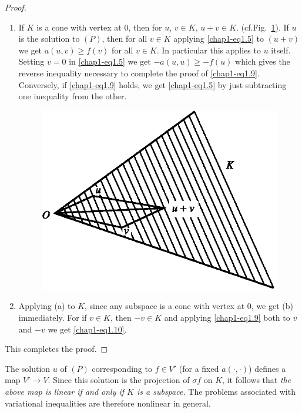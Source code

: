 \begin{proof}
\begin{enumerate}
\renewcommand{\theenumi}{\alph{enumi}}
\renewcommand{\labelenumi}{(\theenumi)}
\item If $K$ is a cone with vertex at $0$, then for $u$, $v\in K$, $u+v\in
K$. (cf.\@ Fig.~\ref{chap1-fig1.2}). If $u$ is the solution to $(P)$, then for all
$v\in K$ applying \eqref{chap1-eq1.5} to $(u+v)$ we get $a(u,v)\geq
f(v)$ for all $v\in K$. In particular this applies to $u$
itself. Setting $v=0$ in \eqref{chap1-eq1.5} we get $-a(u,u)\geq
-f(u)$ which gives the reverse inequality necessary to complete the
proof of \eqref{chap1-eq1.9}. Conversely, if \eqref{chap1-eq1.9}
holds, we get \eqref{chap1-eq1.5} by just subtracting one inequality
from the other.
\begin{figure}[H]
\centering
\includegraphics{figure/fig1.2.eps}
\caption{}\label{chap1-fig1.2}
\end{figure}

\item Applying (a) to $K$, since any subspace is a cone with vertex at
  $0$, we get (b) immediately. For if $v\in K$, then $-v\in K$ and
  applying \eqref{chap1-eq1.9} both to $v$ and $-v$ we get
  \eqref{chap1-eq1.10}. 
\end{enumerate}

This completes the proof.
\end{proof}

\begin{remark}\label{chap1-rem1.3}
The solution $u$ of $(P)$ corresponding to $f\in V'$ (for a fixed
$a(\cdot,\cdot)$) defines a map $V'\to V$. Since this solution is the
projection of $\sigma f$ on $K$, it follows that {\em the above map is
  linear if and only if $K$ is a subspace.} The problems associated
with variational inequalities are therefore nonlinear in general.
\end{remark}


